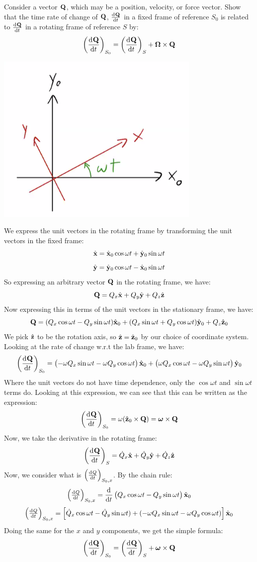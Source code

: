 \begin{p}
Consider a vector $\mathbf{Q}$, which may be a position, velocity, or force vector. Show that the time rate of change of $\mathbf{Q}$, $\od{\v{Q}}{t}$ in a fixed frame of reference $S_0$ is related to $\od{\v{Q}}{t}$ in a rotating frame of reference $S$ by:
\[\left(\dod{\v{Q}}{t}\right)_{S_0} = \left(\dod{\v{Q}}{t}\right)_{S} + \v{\Omega} \times \v{Q}\]
\end{p}
\begin{s}
\begin{center}
    \includegraphics[scale=0.75]{Lecture-15/w15-img2.png}
\end{center}
We express the unit vectors in the rotating frame by transforming the unit vectors in the fixed frame:
\[\hat{\mathbf{x}} = \hat{\mathbf{x}}_0\cos\omega t + \hat{\mathbf{y}}_0\sin\omega t\]
\[\hat{\mathbf{y}} = \hat{\mathbf{y}}_0\cos\omega t - \hat{\mathbf{x}}_0\sin\omega t\]
So expressing an arbitrary vector $\mathbf{Q}$ in the rotating frame, we have:
\[\mathbf{Q} = Q_x\hat{\mathbf{x}} + Q_y\hat{\mathbf{y}} + Q_z\hat{\mathbf{z}}\]
Now expressing this in terms of the unit vectors in the stationary frame, we have:
\[\mathbf{Q} = (Q_x\cos\omega t - Q_y\sin\omega t)\hat{\mathbf{x}}_0 + (Q_x\sin\omega t + Q_y\cos\omega t)\hat{\mathbf{y}}_0 + Q_z\hat{\mathbf{z}}_0\]
We pick $\hat{\mathbf{z}}$ to be the rotation axis, so $\hat{\mathbf{z}} = \hat{\mathbf{z}}_0$ by our choice of coordinate system. Looking at the rate of change w.r.t the lab frame, we have:
\[\left(\dod{\v{Q}}{t}\right)_{S_0} = \left(-\omega Q_x\sin\omega t - \omega Q_y\cos\omega t\right)\xhat_0 + \left(\omega Q_x\cos\omega t - \omega Q_y \sin \omega t\right)\yhat_0 \]
Where the unit vectors do not have time dependence, only the $\cos\omega t$ and $\sin\omega t$ terms do. Looking at this expression, we can see that this can be written as the expression:
\[\left(\dod{\v{Q}}{t}\right)_{S_0} = \omega(\zhat_0 \times \v{Q}) = \bm{\omega} \times \v{Q}\]
Now, we take the derivative in the rotating frame:
\[\left(\dod{\v{Q}}{t}\right)_{S} = \dot{Q}_x\xhat + \dot{Q}_y \yhat + \dot{Q}_z \zhat\]
Now, we consider what is $\left(\od{Q}{t}\right)_{S_0, x}$. By the chain rule:
\[\left(\od{Q}{t}\right)_{S_0, x} = \dod{}{t}\left(Q_x\cos\omega t - Q_y\sin\omega t\right)\xhat_0\]
\[\left(\od{Q}{t}\right)_{S_0, x} = \left[\dot{Q}_x\cos\omega t - \dot{Q}_y\sin\omega t) + (-\omega Q_x\sin\omega t - \omega Q_y\cos\omega t)\right]\xhat_0\]
Doing the same for the $x$ and $y$ components, we get the simple formula:
\[\left(\dod{\v{Q}}{t}\right)_{S_0} = \left(\dod{\v{Q}}{t}\right)_{S} + \bm{\omega}\times\v{Q}\]
\end{s}

